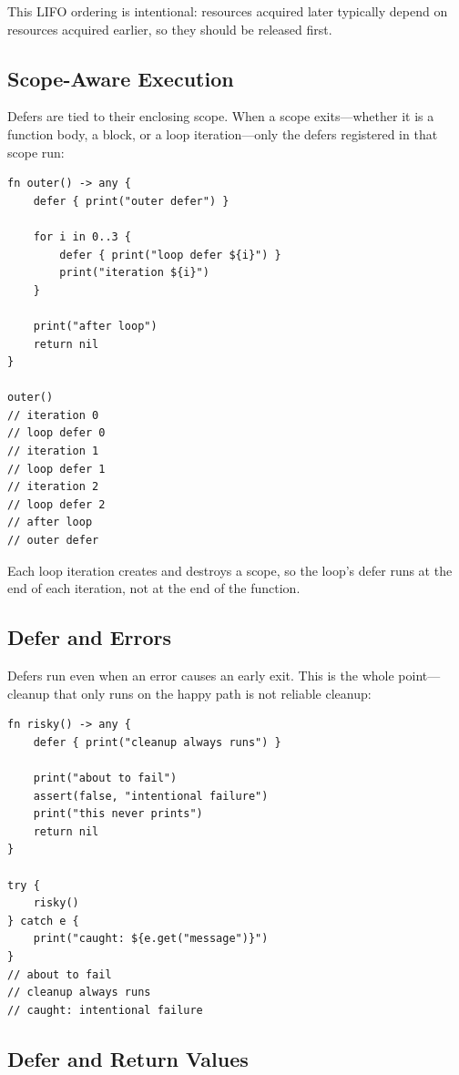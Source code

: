 This LIFO ordering is intentional: resources acquired later typically depend on resources acquired earlier, so they should be released first.

\subsection{Scope-Aware Execution}\label{sec:defer-scopes}

Defers are tied to their enclosing scope. When a scope exits---whether it is a function body, a block, or a loop iteration---only the defers registered in that scope run:

\begin{lstlisting}[language=Lattice, caption={Defer and scope boundaries}]
fn outer() -> any {
    defer { print("outer defer") }

    for i in 0..3 {
        defer { print("loop defer ${i}") }
        print("iteration ${i}")
    }

    print("after loop")
    return nil
}

outer()
// iteration 0
// loop defer 0
// iteration 1
// loop defer 1
// iteration 2
// loop defer 2
// after loop
// outer defer
\end{lstlisting}

Each loop iteration creates and destroys a scope, so the loop's defer runs at the end of each iteration, not at the end of the function.

\subsection{Defer and Errors}\label{sec:defer-errors}

Defers run even when an error causes an early exit. This is the whole point---cleanup that only runs on the happy path is not reliable cleanup:

\begin{lstlisting}[language=Lattice, caption={Defer runs on error paths}]
fn risky() -> any {
    defer { print("cleanup always runs") }

    print("about to fail")
    assert(false, "intentional failure")
    print("this never prints")
    return nil
}

try {
    risky()
} catch e {
    print("caught: ${e.get("message")}")
}
// about to fail
// cleanup always runs
// caught: intentional failure
\end{lstlisting}

\subsection{Defer and Return Values}\label{sec:defer-return}

